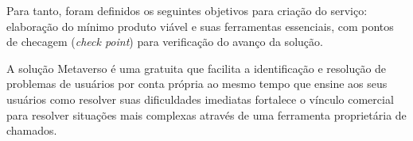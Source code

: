 		Para tanto, foram definidos os seguintes objetivos para criação do serviço: elaboração do mínimo produto viável e suas ferramentas essenciais, com pontos de checagem (\textit{check point}) para verificação do avanço da solução.
		
		A solução Metaverso é uma gratuita que facilita a identificação e resolução de problemas de usuários por conta própria ao mesmo tempo que ensine aos seus usuários como resolver suas dificuldades imediatas fortalece o vínculo comercial para resolver situações mais complexas através de uma ferramenta proprietária de chamados.
	

